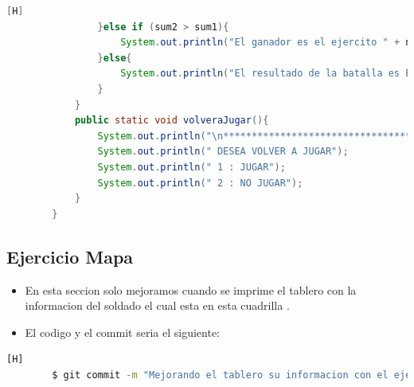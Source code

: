 \documentclass{article}
\begin{document}
\begin{lstlisting}[language=java,caption={Las lineas de codigos de la clase Mapa creada:}][H]
				}else if (sum2 > sum1){
					System.out.println("El ganador es el ejercito " + n2 + " de: " + kingdom2 +". Ya que al generar los porcentajes de probabilidad de victoria basada en los niveles de vida de sus soldados y aplicando un experimento aleatorio salio vencedor. (Aleatorio generado : "+ numero2 + ")");
				}else{
					System.out.println("El resultado de la batalla es Empate");
				}
			}
			public static void volveraJugar(){
				System.out.println("\n*********************************");
				System.out.println(" DESEA VOLVER A JUGAR");
				System.out.println(" 1 : JUGAR");
				System.out.println(" 2 : NO JUGAR");
			}
		}
	\end{lstlisting}
	\subsection{Ejercicio Mapa}
	\begin{itemize}	
		\item En esta seccion solo mejoramos cuando se imprime el tablero con la informacion del soldado el cual esta en esta cuadrilla .
		\item El codigo y el commit seria el siguiente:
	\end{itemize}	
	\begin{lstlisting}[language=bash,caption={Commit}][H]
		$ git commit -m "Mejorando el tablero su informacion con el ejercito donde pertenecen , el tipo de soldado y su nivel de vida"
	\end{lstlisting}	
\end{document}
